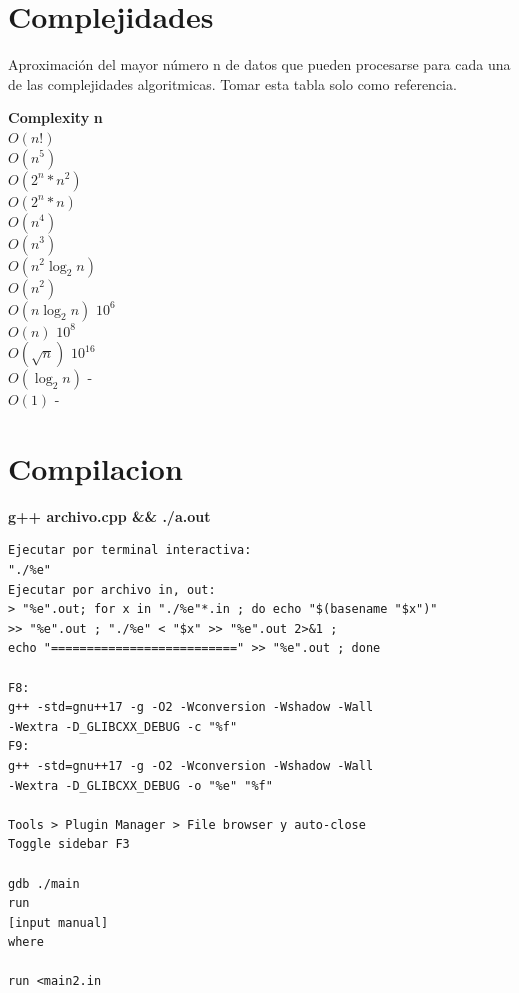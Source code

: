 \section{Complejidades}
Aproximación del mayor número n de datos que pueden procesarse para cada una de las complejidades algoritmicas. Tomar esta tabla solo como referencia.

\begin{tabbing}
\textbf{Complexity}\hspace{4cm} \=  \textbf{n}\hspace{3cm}   \\ 
$O(n!)$ \\ 
$O(n^{5})$ \\ 
$O(2^{n}*n^{2})$ \\ 
$O(2^{n}*n)$ \\ 
$O(n^{4})$ \\ 
$O(n^{3})$ \\ 
$O(n^{2}\log_{2}n)$ \\ 
$O(n^{2})$ \\ 
$O(n\log_{2}n)$ \> $10^{6}$\\ 
$O(n)$ \> $10^{8}$\\ 
$O(\sqrt{n})$ \> $10^{16}$\\ 
$O(\log_{2}n)$ \> -\\ 
$O(1)$ \> -\\ 
\end{tabbing}

\section{Compilacion}
\textbf{g++ archivo.cpp \&\& ./a.out}

\begin{verbatim}
Ejecutar por terminal interactiva:
"./%e"
Ejecutar por archivo in, out:
> "%e".out; for x in "./%e"*.in ; do echo "$(basename "$x")" 
>> "%e".out ; "./%e" < "$x" >> "%e".out 2>&1 ;
echo "==========================" >> "%e".out ; done

F8:
g++ -std=gnu++17 -g -O2 -Wconversion -Wshadow -Wall
-Wextra -D_GLIBCXX_DEBUG -c "%f"
F9:
g++ -std=gnu++17 -g -O2 -Wconversion -Wshadow -Wall
-Wextra -D_GLIBCXX_DEBUG -o "%e" "%f"

Tools > Plugin Manager > File browser y auto-close
Toggle sidebar F3

gdb ./main
run
[input manual]
where

run <main2.in
\end{verbatim}


